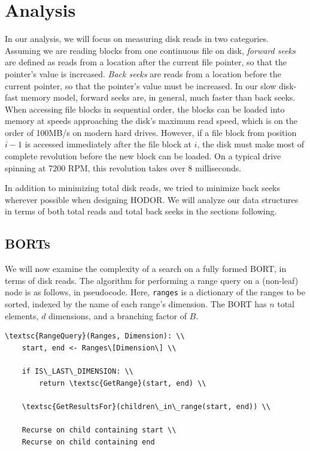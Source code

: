 \documentclass[11pt, oneside]{article}
\newcommand{\ms}{\texttt}
\begin{document}
\section{Analysis}

In our analysis, we will focus on measuring disk reads in two categories.
Assuming we are reading blocks from one continuous file on disk, \textit{forward
seeks} are defined as reads from a location after the current file pointer, so
that the pointer's value is increased. \textit{Back seeks} are reads from a
location before the current pointer, so that the pointer's value must be
increased. In our slow disk-fast memory model, forward seeks are, in general,
much faster than back seeks. When accessing file blocks in sequential order, the
blocks can be loaded into memory at speeds approaching the disk's maximum read
speed, which is on the order of 100MB/s on modern hard drives. However, if a
file block from position $i-1$ is accessed immediately after the file block at
$i$, the disk must make most of complete revolution before the new block can be
loaded. On a typical drive spinning at 7200 RPM, this revolution takes over 8
milliseconds.


In addition to minimizing total disk reads, we tried to minimize back seeks
wherever possible when designing HODOR. We will analyze our data structures in
terms of both total reads and total back seeks in the sections following.

\subsection{BORTs}

We will now examine the complexity of a search on a fully formed BORT, in terms
of disk reads. The algorithm for performing a range query on a (non-leaf) node
is as follows, in pseudocode. Here, \ms{ranges} is a dictionary of the
ranges to be sorted, indexed by the name of each range's dimension. The BORT has
$n$ total elements, $d$ dimensions, and a branching factor of $B$.

\begin{verbatim}
\textsc{RangeQuery}(Ranges, Dimension): \\
    start, end <- Ranges\[Dimension\] \\
    
    if IS\_LAST\_DIMENSION: \\
        return \textsc{GetRange}(start, end) \\

    \textsc{GetResultsFor}(children\_in\_range(start, end)) \\

    Recurse on child containing start \\
    Recurse on child containing end
\end{verbatim}
\end{document}
